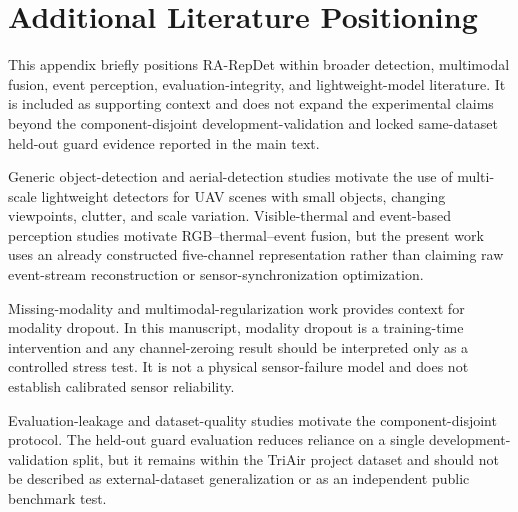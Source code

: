 \appendix
\section{Additional Literature Positioning}
\label{app:literature-positioning}

This appendix briefly positions RA-RepDet within broader detection, multimodal fusion, event perception, evaluation-integrity, and lightweight-model literature. It is included as supporting context and does not expand the experimental claims beyond the component-disjoint development-validation and locked same-dataset held-out guard evidence reported in the main text.

Generic object-detection and aerial-detection studies motivate the use of multi-scale lightweight detectors for UAV scenes with small objects, changing viewpoints, clutter, and scale variation. Visible-thermal and event-based perception studies motivate RGB--thermal--event fusion, but the present work uses an already constructed five-channel representation rather than claiming raw event-stream reconstruction or sensor-synchronization optimization.

Missing-modality and multimodal-regularization work provides context for modality dropout. In this manuscript, modality dropout is a training-time intervention and any channel-zeroing result should be interpreted only as a controlled stress test. It is not a physical sensor-failure model and does not establish calibrated sensor reliability.

Evaluation-leakage and dataset-quality studies motivate the component-disjoint protocol. The held-out guard evaluation reduces reliance on a single development-validation split, but it remains within the TriAir project dataset and should not be described as external-dataset generalization or as an independent public benchmark test.
